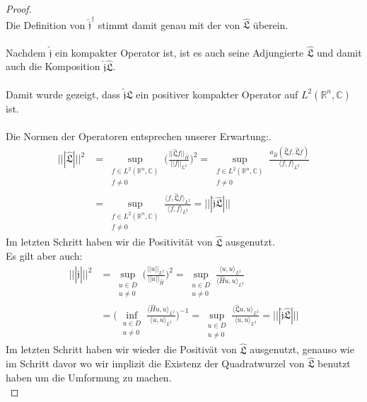 \documentclass[11pt,a4paper,leqno]{report}
\numberwithin{equation}{chapter}
\begin{document}
\begin{proof}
\begin{equation*}
\end{equation*}
Die Definition von $\hat{\mathfrak{j}}^\dagger$ stimmt damit genau mit der von $\hat{\mathfrak{L}}$ überein.\\
\\
Nachdem $\hat{\mathfrak{j}}$ ein kompakter Operator ist, ist es  auch seine Adjungierte $\hat{\mathfrak{L}}$ und damit auch die Komposition $\hat{\mathfrak{j}}\hat{\mathfrak{L}}$.
\\
\\
Damit wurde gezeigt, dass $\hat{\mathfrak{j}}\hat{\mathfrak{L}}$ ein positiver kompakter Operator auf $L^2(\mathbb{R}^n,\mathbb{C})$ ist. 
\\
\\
Die Normen der Operatoren entsprechen unserer Erwartung:.
	\begin{align*}
		|||\hat{\mathfrak{L}}|||^2 &= \sup_{\substack{f \in L^2(\mathbb{R}^n,\mathbb{C}) \\ f \neq 0}} \Big( \frac{||\hat{\mathfrak{L}}f||_{\hat{H}}}{||f||_{L^2}}\Big)^2= \sup_{\substack{f \in L^2(\mathbb{R}^n,\mathbb{C}) \\ f \neq 0}}  \frac{a_{\hat{H}}(\hat{\mathfrak{L}}f, \hat{\mathfrak{L}}f)}{\langle f, f\rangle_{L^2}}\\&= \sup_{\substack{f \in L^2(\mathbb{R}^n,\mathbb{C}) \\ f \neq 0}}  \frac{\langle f, \hat{\mathfrak{L}}f\rangle_{L^2}}{\langle f, f\rangle_{L^2}}=|||\hat{\mathfrak{j}}\hat{\mathfrak{L}}|||
	\end{align*}
Im letzten Schritt haben wir die Positivität von $\hat{\mathfrak{L}}$ ausgenutzt.\\
Es gilt aber auch:
\begin{align*}
|||\hat{\mathfrak{j}}|||^2 &= \sup_{\substack{u \in D \\ u \neq 0}}\Big( \frac{||u||_{L^2}}{||u||_{\hat{H}}}\Big)^2= \sup_{\substack{u \in D \\ u \neq 0}} \frac{\langle u, u\rangle_{L^2}}{\langle \hat{H}u, u\rangle_{L^2}}\\&= \Big(\inf_{\substack{u \in D \\ u \neq 0}} \frac{\langle \hat{H}u, u\rangle_{L^2}}{\langle u, u\rangle_{L^2}}\Big)^{-1}=\sup_{\substack{u \in D \\ u \neq 0}} \frac{\langle \hat{\mathfrak{L}}u, u\rangle_{L^2}}{\langle u, u\rangle_{L^2}}=|||\hat{\mathfrak{j}}\hat{\mathfrak{L}}|||
\end{align*}
Im letzten Schritt haben wir wieder die Positivät von $\hat{\mathfrak{L}}$ ausgenutzt, genauso wie im Schritt davor wo wir implizit die Existenz der Quadratwurzel von $\hat{\mathfrak{L}}$ benutzt haben um die Umformung zu machen.\\

\end{proof}
\end{document}
